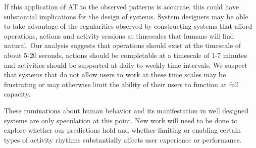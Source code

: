 If this application of AT to the observed patterns is accurate, this could have substantial implications for the design of systems.  System designers may be able to take advantage of the regularities observed by constructing systems that afford operations, actions and activity sessions at timescales that humans will find natural.  Our analysis suggests that operations should exist at the timescale of about 5-20 seconds, actions should be completable at a timescale of 1-7 minutes and activities should be supported at daily to weekly time intervals.  We suspect that systems that do not allow users to work at these time scales may be frustrating or may otherwise limit the ability of their users to function at full capacity.

These ruminations about human behavior and its manifestation in well designed systems are only speculation at this point.  New work will need to be done to explore whether our predictions hold and whether limiting or enabling certain types of activity rhythms substantially affects user experience or performance.

